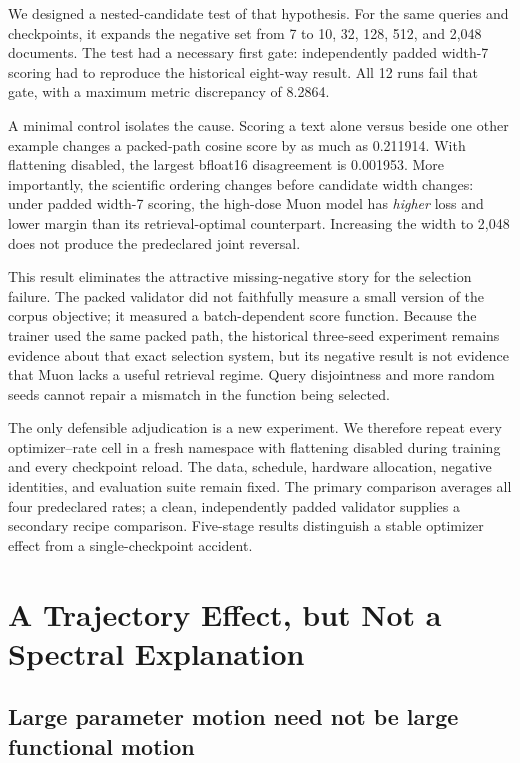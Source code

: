 \documentclass[11pt]{article}
\begin{document}
We designed a nested-candidate test of that hypothesis. For the same queries and checkpoints, it
expands the negative set from 7 to 10, 32, 128, 512, and 2,048 documents. The test had a necessary
first gate: independently padded width-7 scoring had to reproduce the historical eight-way result.
All 12 runs fail that gate, with a maximum metric discrepancy of 8.2864.

A minimal control isolates the cause. Scoring a text alone versus beside one other example changes
a packed-path cosine score by as much as 0.211914. With flattening disabled, the largest bfloat16
disagreement is 0.001953. More importantly, the scientific ordering changes before candidate width
changes: under padded width-7 scoring, the high-dose Muon model has \emph{higher} loss and lower
margin than its retrieval-optimal counterpart. Increasing the width to 2,048 does not produce the
predeclared joint reversal.



This result eliminates the attractive missing-negative story for the selection failure. The packed
validator did not faithfully measure a small version of the corpus objective; it measured a
batch-dependent score function. Because the trainer used the same packed path, the historical
three-seed experiment remains evidence about that exact selection system, but its negative result is
not evidence that Muon lacks a useful retrieval regime. Query disjointness and more random seeds
cannot repair a mismatch in the function being selected.

The only defensible adjudication is a new experiment. We therefore repeat every optimizer--rate cell
in a fresh namespace with flattening disabled during training and every checkpoint reload. The data,
schedule, hardware allocation, negative identities, and evaluation suite remain fixed. The primary
comparison averages all four predeclared rates; a clean, independently padded validator supplies a
secondary recipe comparison. Five-stage results distinguish a stable optimizer effect from a
single-checkpoint accident.

\CorrectedMainSection

\section{A Trajectory Effect, but Not a Spectral Explanation}

\subsection{Large parameter motion need not be large functional motion}
\end{document}
